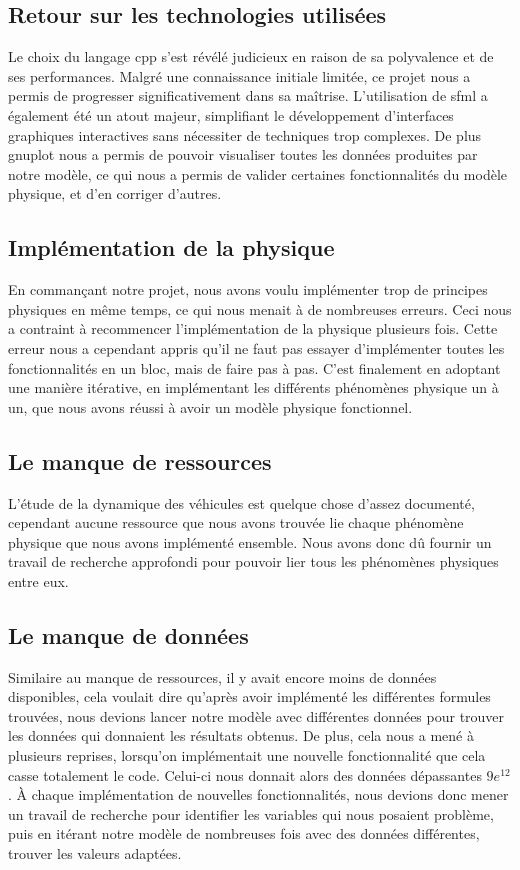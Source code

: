\subsection{Retour sur les technologies utilisées}\label{subsec:retour-sur-les-technologies-utilisees}
Le choix du langage \gls{cpp} s'est révélé judicieux en raison de sa polyvalence et de ses performances.
Malgré une connaissance initiale limitée, ce projet nous a permis de progresser significativement dans sa maîtrise.
L'utilisation de \gls{sfml} a également été un atout majeur, simplifiant le développement d'interfaces graphiques interactives sans nécessiter de techniques trop complexes.
De plus \gls{gnuplot} nous a permis de pouvoir visualiser toutes les données produites par notre modèle, ce qui nous a permis de valider certaines fonctionnalités du modèle physique, et d'en corriger d'autres.


\subsection{Implémentation de la physique}\label{subsec:implem-phys}
En commançant notre projet, nous avons voulu implémenter trop de principes physiques en même temps, ce qui nous menait à de nombreuses erreurs.
Ceci nous a contraint à recommencer l'implémentation de la physique plusieurs fois.
Cette erreur nous a cependant appris qu'il ne faut pas essayer d'implémenter toutes les fonctionnalités en un bloc, mais de faire pas à pas.
C'est finalement en adoptant une manière itérative, en implémentant les différents phénomènes physique un à un, que nous avons réussi à avoir un modèle physique fonctionnel.

\subsection{Le manque de ressources}\label{subsec:manque-ressources}
L'étude de la dynamique des véhicules est quelque chose d'assez documenté, cependant aucune ressource que nous avons trouvée lie chaque phénomène physique que nous avons implémenté ensemble.
Nous avons donc dû fournir un travail de recherche approfondi pour pouvoir lier tous les phénomènes physiques entre eux.

\subsection{Le manque de données}\label{subsec:manque-data}
Similaire au manque de ressources, il y avait encore moins de données disponibles, cela voulait dire qu'après avoir implémenté les différentes formules trouvées, nous devions lancer notre modèle avec différentes données pour trouver les données qui donnaient les résultats obtenus.
De plus, cela nous a mené à plusieurs reprises, lorsqu'on implémentait une nouvelle fonctionnalité que cela casse totalement le code.
Celui-ci nous donnait alors des données dépassantes $9e^{12}$.
À chaque implémentation de nouvelles fonctionnalités, nous devions donc mener un travail de recherche pour identifier les variables qui nous posaient problème, puis en itérant notre modèle de nombreuses fois avec des données différentes, trouver les valeurs adaptées.



